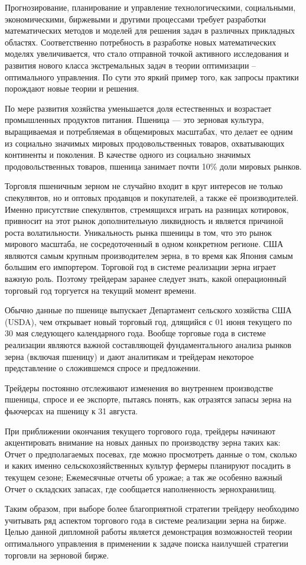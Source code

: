 Прогнозирование, планирование и управление технологическими, социальными, экономическими, биржевыми и другими процессами требует разработки математических методов и моделей для решения задач в различных прикладных областях. Соответственно потребность в разработке новых математических моделях увеличивается, что стало отправной точкой активного исследования и развития нового класса экстремальных задач в теории оптимизации – оптимального управления. По сути это яркий пример того, как запросы практики порождают новые теории и решения.


По мере развития хозяйства уменьшается доля естественных и возрастает промышленных продуктов питания. Пшеница — это зерновая культура, выращиваемая и потребляемая в общемировых масштабах, что делает ее одним из социально значимых мировых продовольственных товаров, охватывающих континенты и поколения. В качестве одного из социально значимых продовольственных товаров, пшеница занимает почти 10\% доли мировых рынков.


Торговля пшеничным зерном не случайно входит в круг интересов не только спекулянтов, но и оптовых продавцов и покупателей, а также её производителей. Именно присутствие спекулянтов, стремящихся играть на разницах котировок, привносит на этот рынок дополнительную ликвидность и является причиной роста волатильности. Уникальность рынка пшеницы в том, что это рынок мирового масштаба, не сосредоточенный в одном конкретном регионе. США являются самым крупным производителем зерна, в то время как Япония самым большим его импортером.
Торговой год в системе реализации зерна играет важную роль. Поэтому трейдерам заранее следует знать, какой операционный торговый год торгуется на текущий момент времени.


Обычно данные по пшенице выпускает Департамент сельского хозяйства США (USDA), чем открывает новый торговый год, длящийся с 01 июня текущего по 30 мая следующего календарного года. Вообще торговые года в системе реализации являются важной составляющей фундаментального анализа рынков зерна (включая пшеницу) и дают аналитикам и трейдерам некоторое представление о сложившемся спросе и предложении.



Трейдеры постоянно отслеживают изменения во внутреннем производстве пшеницы, спросе и ее экспорте, пытаясь понять, как отразятся запасы зерна на фьючерсах на пшеницу к 31 августа.


При приближении окончания текущего торгового года, трейдеры начинают акцентировать внимание на новых данных по производству зерна таких как: Отчет о предполагаемых посевах, где можно просмотреть данные о том, сколько и каких именно сельскохозяйственных культур фермеры планируют посадить в текущем сезоне; Ежемесячные отчеты об урожае; а так же особенно важный Отчет о складских запасах, где сообщается наполненность зернохранилищ.


Таким образом, при выборе более благоприятной стратегии трейдеру необходимо учитывать ряд аспектом торгового года в системе реализации зерна на бирже.
Целью данной дипломной работы является демонстрация возможностей теории оптимального управления в применении к задаче поиска наилучшей стратегии торговли на зерновой бирже.
